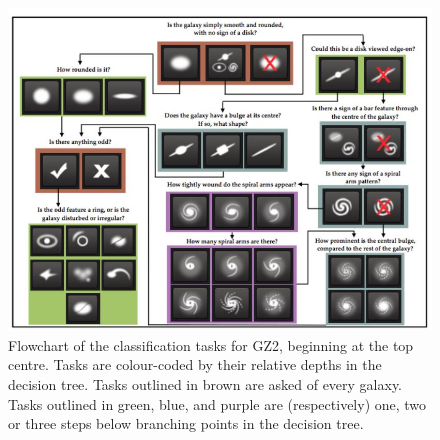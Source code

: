 \begin{figure}[h]
\centering
\includegraphics[scale=0.9]{figures/decision_tree.jpg}
\caption{Flowchart of the classification tasks for GZ2, beginning at the top centre. Tasks are colour-coded by their relative depths in the decision tree. Tasks outlined in brown are asked of every galaxy. Tasks outlined in green, blue, and purple are (respectively) one, two or three steps below branching points in the decision tree\cite{galaxyzoo2}.}
\label{decision_tree}
\end{figure}


  

